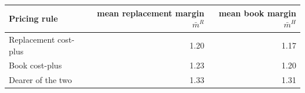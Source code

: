 \begin{tabular}{lrr}
\toprule
Pricing rule & mean replacement margin $\bar m^{R}$ & mean book margin $\bar m^{H}$ \\
\midrule
Replacement cost-plus & 1.20 & 1.17 \\
Book cost-plus & 1.23 & 1.20 \\
Dearer of the two & 1.33 & 1.31 \\
\bottomrule
\end{tabular}